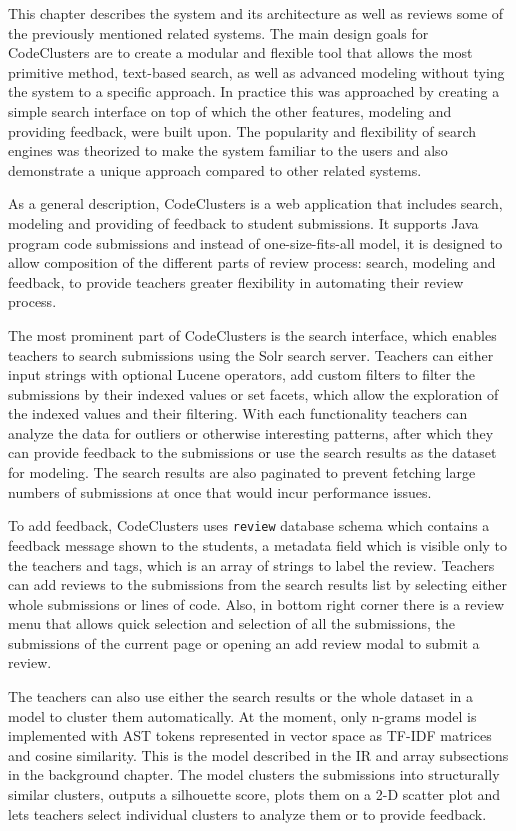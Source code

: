 This chapter describes the system and its architecture as well as reviews some of the previously mentioned related systems. The main design goals for CodeClusters are to create a modular and flexible tool that allows the most primitive method, text-based search, as well as advanced modeling without tying the system to a specific approach. In practice this was approached by creating a simple search interface on top of which the other features, modeling and providing feedback, were built upon. The popularity and flexibility of search engines was theorized to make the system familiar to the users and also demonstrate a unique approach compared to other related systems.

As a general description, CodeClusters is a web application that includes search, modeling and providing of feedback to student submissions. It supports Java program code submissions and instead of one-size-fits-all model, it is designed to allow composition of the different parts of review process: search, modeling and feedback, to provide teachers greater flexibility in automating their review process. 

The most prominent part of CodeClusters is the search interface, which enables teachers to search submissions using the Solr search server. Teachers can either input strings with optional Lucene operators, add custom filters to filter the submissions by their indexed values or set facets, which allow the exploration of the indexed values and their filtering. With each functionality teachers can analyze the data for outliers or otherwise interesting patterns, after which they can provide feedback to the submissions or use the search results as the dataset for modeling. The search results are also paginated to prevent fetching large numbers of submissions at once that would incur performance issues.

To add feedback, CodeClusters uses \texttt{review} database schema which contains a feedback message shown to the students, a metadata field which is visible only to the teachers and tags, which is an array of strings to label the review. Teachers can add reviews to the submissions from the search results list by selecting either whole submissions or lines of code. Also, in bottom right corner there is a review menu that allows quick selection and selection of all the submissions, the submissions of the current page or opening an add review modal to submit a review.

The teachers can also use either the search results or the whole dataset in a model to cluster them automatically. At the moment, only n-grams model is implemented with AST tokens represented in vector space as TF-IDF matrices and cosine similarity. This is the model described in the IR and array subsections in the background chapter. The model clusters the submissions into structurally similar clusters, outputs a silhouette score, plots them on a 2-D scatter plot and lets teachers select individual clusters to analyze them or to provide feedback.


